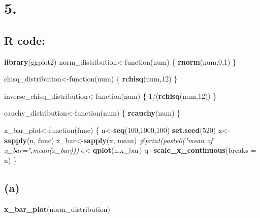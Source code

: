 \documentclass[]{article}
\title{}
\author{}
\date{}
\newenvironment{Shaded}{\begin{snugshade}}{\end{snugshade}}
\newcommand{\KeywordTok}[1]{\textcolor[rgb]{0.13,0.29,0.53}{\textbf{{#1}}}}
\newcommand{\DataTypeTok}[1]{\textcolor[rgb]{0.13,0.29,0.53}{{#1}}}
\newcommand{\DecValTok}[1]{\textcolor[rgb]{0.00,0.00,0.81}{{#1}}}
\newcommand{\CommentTok}[1]{\textcolor[rgb]{0.56,0.35,0.01}{\textit{{#1}}}}
\newcommand{\NormalTok}[1]{{#1}}
\begin{document}
\section{\texorpdfstring{\textbf{5.}}{5.}}\label{section}

\subsection{R code:}\label{r-code}

\begin{Shaded}
\begin{Highlighting}[]
\KeywordTok{library}\NormalTok{(ggplot2)}
\NormalTok{norm_distribution<-function(num)}
\NormalTok{\{}
  \KeywordTok{rnorm}\NormalTok{(num,}\DecValTok{0}\NormalTok{,}\DecValTok{1}\NormalTok{)}
\NormalTok{\}}

\NormalTok{chisq_distribution<-function(num)}
\NormalTok{\{}
  \KeywordTok{rchisq}\NormalTok{(num,}\DecValTok{12}\NormalTok{)}
\NormalTok{\}}

\NormalTok{inverse_chisq_distribution<-function(num)}
\NormalTok{\{}
  \DecValTok{1}\NormalTok{/(}\KeywordTok{rchisq}\NormalTok{(num,}\DecValTok{12}\NormalTok{))}
\NormalTok{\}}

\NormalTok{cauchy_distribution<-function(num)}
\NormalTok{\{}
  \KeywordTok{rcauchy}\NormalTok{(num)}
\NormalTok{\}}

\NormalTok{x_bar_plot<-function(func)}
\NormalTok{\{}
  \NormalTok{n<-}\KeywordTok{seq}\NormalTok{(}\DecValTok{100}\NormalTok{,}\DecValTok{1000}\NormalTok{,}\DecValTok{100}\NormalTok{)}
  \KeywordTok{set.seed}\NormalTok{(}\DecValTok{520}\NormalTok{)}
  \NormalTok{x<-}\KeywordTok{sapply}\NormalTok{(n, func)}
  \NormalTok{x_bar<-}\KeywordTok{sapply}\NormalTok{(x, mean)}
  \CommentTok{#print(paste0("mean of x_bar=",mean(x_bar)))}
  \NormalTok{q<-}\KeywordTok{qplot}\NormalTok{(n,x_bar)}
  \NormalTok{q+}\KeywordTok{scale_x_continuous}\NormalTok{(}\DataTypeTok{breaks =} \NormalTok{n)}
\NormalTok{\}}
\end{Highlighting}
\end{Shaded}

\newpage

\subsection{(a)}\label{a}

\begin{Shaded}
\begin{Highlighting}[]
\KeywordTok{x_bar_plot}\NormalTok{(norm_distribution)}
\end{Highlighting}
\end{Shaded}
\end{document}
